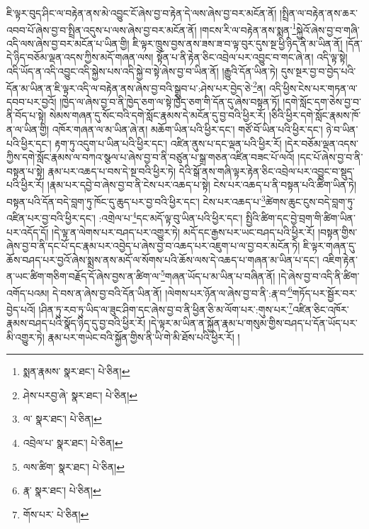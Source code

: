 ཇི་ལྟར་བུད་ཤིང་ལ་བརྟེན་ནས་མེ་འབྱུང་ངོ་ཞེས་བྱ་བ་རྟེན་དེ་ལས་ཞེས་བྱ་བར་མངོན་ནོ། །སྤྲིན་ལ་བརྟེན་ནས་ཆར་འབབ་པོ་ཞེས་བྱ་བ་སྤྲིན་འདུས་པ་ལས་ཞེས་བྱ་བར་མངོན་ནོ། །གངས་རི་ལ་བརྟེན་ནས་སྨན་\footnote{སྨན་རྣམས་  སྣར་ཐང་།  པེ་ཅིན། }སྐྱེའོ་ཞེས་བྱ་བ་གཞི་འདི་ལས་ཞེས་བྱ་བར་མངོན་པ་ཡིན་གྱི། ཇི་ལྟར་ཁྲུས་བྱས་ནས་ཟས་ཟ་བ་ལྟ་བུར་དུས་སྔ་ཕྱི་ཉིད་ནི་མ་ཡིན་ནོ། །དོན་དེ་ཉིད་བཅོམ་ལྡན་འདས་ཀྱིས་མདོ་གཞན་ལས། སྟོན་པ་ནི་རྟེན་ཅིང་འབྲེལ་པར་འབྱུང་བ་གང་ཞེ་ན། འདི་ལྟ་སྟེ། འདི་ཡོད་ན་འདི་འབྱུང་འདི་སྐྱེས་པས་འདི་སྐྱེ་བ་སྟེ་ཞེས་བྱ་བ་ཡིན་ནོ། །རྒྱུའི་དོན་ཡིན་ཏེ། དུས་སྔར་བྱ་བ་བྱེད་པའི་དོན་མ་ཡིན་ན་ཇི་ལྟར་འདི་ལ་བརྟེན་ནས་ཞེས་བྱ་བའི་སྒྲུབ་པ་:ཤེས་པར་བྱེད་ཅེ་\footnote{ཤེས་པརབྱ་ཞེ་  སྣར་ཐང་།  པེ་ཅིན། }ན། འདི་ཕྱིས་ངེས་པར་གཏན་ལ་དབབ་པར་བྱའོ། །ཁྱེད་ལ་ཞེས་བྱ་བ་ནི་ཁྱེད་ཅག་ལ་སྟེ་ཁྱེད་ཅག་གི་དོན་དུ་ཞེས་བསྟན་ཏོ། །དགེ་སློང་དག་ཅེས་བྱ་བ་ནི་བོད་པ་སྟེ། སེམས་གཞན་དུ་སོང་བའི་དགེ་སློང་རྣམས་དེ་མངོན་དུ་བྱ་བའི་ཕྱིར་རོ། །ཅིའི་ཕྱིར་དགེ་སློང་རྣམས་ཁོ་ན་ལ་ཡིན་གྱི། འཁོར་གཞན་ལ་མ་ཡིན་ཞེ་ན། མཆོག་ཡིན་པའི་ཕྱིར་དང་། གཙོ་བོ་ཡིན་པའི་ཕྱིར་དང་། ཉེ་བ་ཡིན་པའི་ཕྱིར་དང་། རྟག་ཏུ་འདུག་པ་ཡིན་པའི་ཕྱིར་དང་། འཛིན་ནུས་པ་དང་ལྡན་པའི་ཕྱིར་རོ། །དེར་བཅོམ་ལྡན་འདས་ཀྱིས་དགེ་སློང་རྣམས་ལ་བཀའ་སྩལ་པ་ཞེས་བྱ་བ་ནི་བཙུན་པ་སྒྲ་གཅན་འཛིན་བཟང་པོ་ལའོ། །དང་པོ་ཞེས་བྱ་བ་ནི་བསྟན་པ་སྟེ། རྣམ་པར་འཆད་པ་བས་དེ་སྔ་བའི་ཕྱིར་ཏེ། དེའི་སྒོ་ནས་གཞི་ལྟར་རྟེན་ཅིང་འབྲེལ་པར་འབྱུང་བ་སྡུད་པའི་ཕྱིར་རོ། །རྣམ་པར་དབྱེ་བ་ཞེས་བྱ་བ་ནི་ངེས་པར་འཆད་པ་སྟེ། ངེས་པར་འཆད་པ་ནི་བསྟན་པའི་ཚིག་ཡིན་ཏེ། བསྟན་པའི་དོན་བདེ་བླག་ཏུ་ཁོང་དུ་ཆུད་པར་བྱ་བའི་ཕྱིར་དང་། ངེས་པར་འཆད་པ་\footnote{ལ་  སྣར་ཐང་།  པེ་ཅིན། }ཚེགས་ཆུང་ངུས་བདེ་བླག་ཏུ་འཛིན་པར་བྱ་བའི་ཕྱིར་དང་། :འགྲེལ་པ་\footnote{འབྲེལ་པ་  སྣར་ཐང་།  པེ་ཅིན། }དང་མདོ་ལྟ་བུ་ཡིན་པའི་ཕྱིར་དང་། སྤྱིའི་ཚིག་དང་བྱེ་བྲག་གི་ཚིག་ཡིན་པར་འདོད་དོ། །དེ་ལྟ་ན་ལེགས་པར་བཤད་པར་འགྱུར་ཏེ། མདོ་དང་རྒྱས་པར་ཡང་བཤད་པའི་ཕྱིར་རོ། །བསྟན་གྱིས་ཞེས་བྱ་བ་ནི་དང་པོ་དང་རྣམ་པར་འབྱེད་པ་ཞེས་བྱ་བ་འཆད་པར་འཇུག་པ་ལ་བྱ་བར་མངོན་ཏེ། ཇི་ལྟར་གཞན་དུ་ཆོས་བཤད་པར་བྱའོ་ཞེས་སྨྲས་ནས་མདོ་ལ་སོགས་པའི་ཆོས་ལས་དེ་འཆད་པ་གཞན་མ་ཡིན་པ་དང་། འཇིག་རྟེན་ན་ཡང་ཚིག་གཅིག་བརྗོད་དོ་ཞེས་བྱས་ན་ཚིག་ལ་\footnote{ལས་ཚིག་  སྣར་ཐང་།  པེ་ཅིན། }གཞན་ཡོད་པ་མ་ཡིན་པ་བཞིན་ནོ། །དེ་ཞེས་བྱ་བ་འདི་ནི་ཚིག་འགོད་པའམ། དེ་བས་ན་ཞེས་བྱ་བའི་དོན་ཡིན་ནོ། །ལེགས་པར་ཉོན་ལ་ཞེས་བྱ་བ་ནི་:རྣ་བ་\footnote{རྣ་  སྣར་ཐང་།  པེ་ཅིན། }གཏོད་པར་སྦྱོར་བར་བྱེད་པའོ། །ཤིན་ཏུ་རབ་ཏུ་ཡིད་ལ་ཟུང་ཤིག་དང་ཞེས་བྱ་བ་ནི་ཕྱིན་ཅི་མ་ལོག་པར་:གུས་པར་\footnote{གོས་པར་  པེ་ཅིན། }འཛིན་ཅིང་འཁོར་རྣམས་བཤད་པའི་སྣོད་ཉིད་དུ་བྱ་བའི་ཕྱིར་རོ། །དེ་ལྟར་མ་ཡིན་ན་སྐྱོན་རྣམ་པ་གསུམ་གྱིས་བཤད་པ་དོན་ཡོད་པར་མི་འགྱུར་ཏེ། རྣམ་པར་གཡེང་བའི་སྐྱོན་གྱིས་ནི་ཡི་གེ་མི་ཐོས་པའི་ཕྱིར་རོ། །
